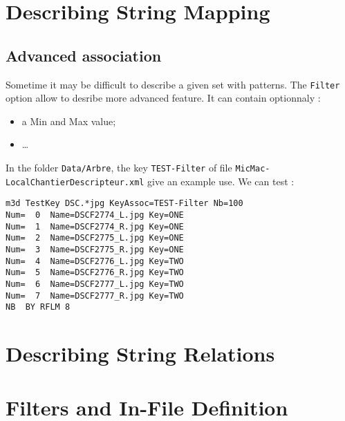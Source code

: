 \section{Describing String Mapping}

\label{Ref:Key:Map}


\subsection{Advanced association}

Sometime it may be difficult to describe a given set with patterns. The {\tt Filter}
option allow to desribe more advanced feature. It can contain optionnaly :

\begin{itemize}
    \item a Min and Max value;
    \item \dots
\end{itemize}

In the folder {\tt Data/Arbre}, the key {\tt TEST-Filter} of file {\tt MicMac-LocalChantierDescripteur.xml}
give an example use. We can test :

\begin{verbatim}
m3d TestKey DSC.*jpg KeyAssoc=TEST-Filter Nb=100 
Num=  0  Name=DSCF2774_L.jpg Key=ONE
Num=  1  Name=DSCF2774_R.jpg Key=ONE
Num=  2  Name=DSCF2775_L.jpg Key=ONE
Num=  3  Name=DSCF2775_R.jpg Key=ONE
Num=  4  Name=DSCF2776_L.jpg Key=TWO
Num=  5  Name=DSCF2776_R.jpg Key=TWO
Num=  6  Name=DSCF2777_L.jpg Key=TWO
Num=  7  Name=DSCF2777_R.jpg Key=TWO
NB  BY RFLM 8
\end{verbatim}


\section{Describing String Relations}


\section{Filters and In-File Definition}





